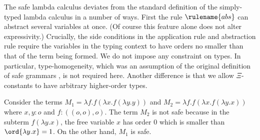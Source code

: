 The safe lambda calculus deviates from the standard definition of
the simply-typed lambda calculus in a number of ways. %
First the rule $\rulename{abs}$ can abstract several variables at once. (Of course this feature alone does not alter expressivity.) Crucially,
the side conditions in the application rule and abstraction rule
require the variables in the typing context to have orders no
smaller than that of the term being formed.  We do not impose any
constraint on types. In particular, type-homogeneity, which was an
assumption of the original definition of safe grammars \cite{KNU02},
is not required here. Another difference is that we allow
$\Xi$-constants to have
arbitrary higher-order types.  %

\begin{example}
\label{ex:kierstead}
Consider the terms $M_1 = \lambda f . f (\lambda x . f (\lambda y . y
))$ and $M_2 = \lambda f . f (\lambda x . f (\lambda y .x ))$ where
$x,y:o$ and $f:((o,o),o)$. The term $M_2$ is not safe because in the
subterm $f (\lambda y . x)$, the free variable $x$ has order $0$ which
is smaller than $\ord{\lambda y . x} = 1$.  On the other hand, $M_1$
is safe.
\end{example}

